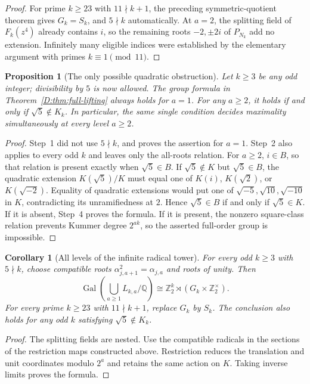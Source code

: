 \documentclass[11pt,a4paper]{article}
\newtheorem{proposition}[theorem]{Proposition}
\newtheorem{corollary}[theorem]{Corollary}
\theoremstyle{definition}
\theoremstyle{remark}
\numberwithin{equation}{section}
\begin{document}
\begin{proof}
For prime $k\ge23$ with $11\nmid k+1$, the preceding symmetric-quotient
theorem gives $G_k=S_k$, and $5\nmid k$ automatically. At $a=2$, the
splitting field of $F_k(z^4)$ already contains $i$, so the remaining
roots $-2,\pm2i$ of $P_{N_k}$ add no extension. Infinitely many eligible
indices were established by the elementary argument with primes
$k\equiv1\pmod {11}$.
\end{proof}

\begin{proposition}[The only possible quadratic obstruction]
\label{D:prop:quadratic-obstruction}
Let $k\ge3$ be any odd integer; divisibility by $5$ is now allowed.
The group formula in Theorem~\ref{D:thm:full-lifting} always holds for
$a=1$. For any $a\ge2$, it holds if and only if
$\sqrt5\notin K_k$. In particular, the same single condition decides
maximality simultaneously at every level $a\ge2$.
\end{proposition}
\begin{proof}
Step~1 did not use $5\nmid k$, and proves the assertion for $a=1$.
Step~2 also applies to every odd $k$ and leaves only the all-roots
relation. For $a\ge2$, $i\in B$, so that relation is present exactly
when $\sqrt5\in B$.
If $\sqrt5\notin K$ but $\sqrt5\in B$, the quadratic extension
$K(\sqrt5)/K$ must equal one of $K(i)$, $K(\sqrt2)$, or
$K(\sqrt{-2})$. Equality of quadratic extensions would put one of
$\sqrt{-5},\sqrt{10},\sqrt{-10}$ in $K$, contradicting its
unramifiedness at $2$. Hence $\sqrt5\in B$ if and only if
$\sqrt5\in K$. If it is absent, Step~4 proves the formula. If it is
present, the nonzero square-class relation prevents Kummer degree
$2^{ak}$, so the asserted full-order group is impossible.
\end{proof}

\begin{corollary}[All levels of the infinite radical tower]
\label{D:cor:tower}
For every odd $k\ge3$ with $5\nmid k$, choose compatible roots
$\alpha_{j,a+1}^2=\alpha_{j,a}$ and roots of unity. Then
\[
 \operatorname{Gal}\left(\bigcup_{a\ge1}L_{k,a}/\mathbb Q\right)
 \cong\mathbb Z_2^k\rtimes(G_k\times\mathbb Z_2^\times).
\]
For every prime $k\ge23$ with $11\nmid k+1$, replace $G_k$ by $S_k$.
The conclusion also holds for any odd $k$ satisfying
$\sqrt5\notin K_k$.
\end{corollary}
\begin{proof}
The splitting fields are nested. Use the compatible radicals in the
sections of the restriction maps constructed above. Restriction reduces
the translation and unit coordinates modulo $2^a$ and retains the same
action on $K$. Taking inverse limits proves the formula.
\end{proof}
\end{document}
